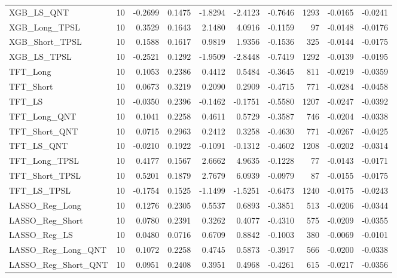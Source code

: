 \begin{tabular}{llrrrrrrrr}
\cline{1-10}
XGB\_LS\_QNT & 10 & -0.2699 & 0.1475 & -1.8294 & -2.4123 & -0.7646 & 1293 & -0.0165 & -0.0241 \\
\cline{1-10}
XGB\_Long\_TPSL & 10 & 0.3529 & 0.1643 & 2.1480 & 4.0916 & -0.1159 & 97 & -0.0148 & -0.0176 \\
\cline{1-10}
XGB\_Short\_TPSL & 10 & 0.1588 & 0.1617 & 0.9819 & 1.9356 & -0.1536 & 325 & -0.0144 & -0.0175 \\
\cline{1-10}
XGB\_LS\_TPSL & 10 & -0.2521 & 0.1292 & -1.9509 & -2.8448 & -0.7419 & 1292 & -0.0139 & -0.0195 \\
\cline{1-10}
TFT\_Long & 10 & 0.1053 & 0.2386 & 0.4412 & 0.5484 & -0.3645 & 811 & -0.0219 & -0.0359 \\
\cline{1-10}
TFT\_Short & 10 & 0.0673 & 0.3219 & 0.2090 & 0.2909 & -0.4715 & 771 & -0.0284 & -0.0458 \\
\cline{1-10}
TFT\_LS & 10 & -0.0350 & 0.2396 & -0.1462 & -0.1751 & -0.5580 & 1207 & -0.0247 & -0.0392 \\
\cline{1-10}
TFT\_Long\_QNT & 10 & 0.1041 & 0.2258 & 0.4611 & 0.5729 & -0.3587 & 746 & -0.0204 & -0.0338 \\
\cline{1-10}
TFT\_Short\_QNT & 10 & 0.0715 & 0.2963 & 0.2412 & 0.3258 & -0.4630 & 771 & -0.0267 & -0.0425 \\
\cline{1-10}
TFT\_LS\_QNT & 10 & -0.0210 & 0.1922 & -0.1091 & -0.1312 & -0.4602 & 1208 & -0.0202 & -0.0314 \\
\cline{1-10}
TFT\_Long\_TPSL & 10 & 0.4177 & 0.1567 & 2.6662 & 4.9635 & -0.1228 & 77 & -0.0143 & -0.0171 \\
\cline{1-10}
TFT\_Short\_TPSL & 10 & 0.5201 & 0.1879 & 2.7679 & 6.0939 & -0.0979 & 87 & -0.0155 & -0.0175 \\
\cline{1-10}
TFT\_LS\_TPSL & 10 & -0.1754 & 0.1525 & -1.1499 & -1.5251 & -0.6473 & 1240 & -0.0175 & -0.0243 \\
\cline{1-10}
LASSO\_Reg\_Long & 10 & 0.1276 & 0.2305 & 0.5537 & 0.6893 & -0.3851 & 513 & -0.0206 & -0.0344 \\
\cline{1-10}
LASSO\_Reg\_Short & 10 & 0.0780 & 0.2391 & 0.3262 & 0.4077 & -0.4310 & 575 & -0.0209 & -0.0355 \\
\cline{1-10}
LASSO\_Reg\_LS & 10 & 0.0480 & 0.0716 & 0.6709 & 0.8842 & -0.1003 & 380 & -0.0069 & -0.0101 \\
\cline{1-10}
LASSO\_Reg\_Long\_QNT & 10 & 0.1072 & 0.2258 & 0.4745 & 0.5873 & -0.3917 & 566 & -0.0200 & -0.0338 \\
\cline{1-10}
LASSO\_Reg\_Short\_QNT & 10 & 0.0951 & 0.2408 & 0.3951 & 0.4968 & -0.4261 & 615 & -0.0217 & -0.0356 \\

\end{tabular}
